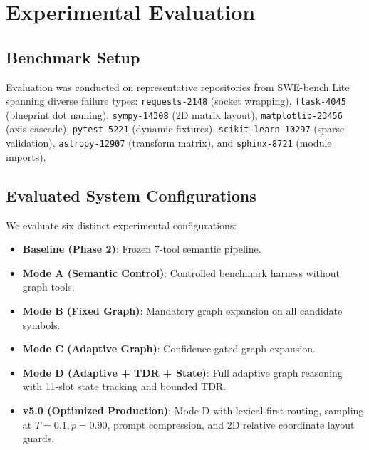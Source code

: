 \documentclass[10pt,twocolumn,letterpaper]{article}
\begin{document}
\section{Experimental Evaluation}

\subsection{Benchmark Setup}
Evaluation was conducted on representative repositories from SWE-bench Lite \cite{jimenez2024swebench} spanning diverse failure types: \texttt{requests-2148} (socket wrapping), \texttt{flask-4045} (blueprint dot naming), \texttt{sympy-14308} (2D matrix layout), \texttt{matplotlib-23456} (axis cascade), \texttt{pytest-5221} (dynamic fixtures), \texttt{scikit-learn-10297} (sparse validation), \texttt{astropy-12907} (transform matrix), and \texttt{sphinx-8721} (module imports).

\subsection{Evaluated System Configurations}
We evaluate six distinct experimental configurations:
\begin{itemize}
    \item \textbf{Baseline (Phase 2)}: Frozen 7-tool semantic pipeline.
    \item \textbf{Mode A (Semantic Control)}: Controlled benchmark harness without graph tools.
    \item \textbf{Mode B (Fixed Graph)}: Mandatory graph expansion on all candidate symbols.
    \item \textbf{Mode C (Adaptive Graph)}: Confidence-gated graph expansion.
    \item \textbf{Mode D (Adaptive + TDR + State)}: Full adaptive graph reasoning with 11-slot state tracking and bounded TDR.
    \item \textbf{v5.0 (Optimized Production)}: Mode D with lexical-first routing, sampling at $T=0.1, p=0.90$, prompt compression, and 2D relative coordinate layout guards.
\end{itemize}
\end{document}
